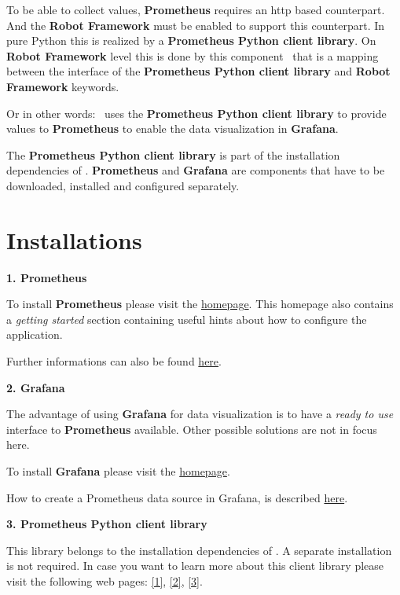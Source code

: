 To be able to collect values, \textbf{Prometheus} requires an http based counterpart. And the \textbf{Robot Framework} must be enabled to support this counterpart.
In pure Python this is realized by a \textbf{Prometheus Python client library}. On \textbf{Robot Framework} level this is done by this component \pkg\ that is a mapping
between the interface of the \textbf{Prometheus Python client library} and \textbf{Robot Framework} keywords.

Or in other words: \pkg\ uses the \textbf{Prometheus Python client library} to provide values to \textbf{Prometheus} to enable the data visualization in \textbf{Grafana}.

The \textbf{Prometheus Python client library} is part of the installation dependencies of \pkg. \textbf{Prometheus} and \textbf{Grafana} are components that
have to be downloaded, installed and configured separately.


\section{Installations}

\textbf{1. Prometheus}

To install \textbf{Prometheus} please visit the \href{https://prometheus.io/}{homepage}. This homepage also contains a \textit{getting started} section containing useful hints
about how to configure the application.

Further informations can also be found \href{https://www.fullstackpython.com/prometheus.html}{here}.

\textbf{2. Grafana}

The advantage of using \textbf{Grafana} for data visualization is to have a \textit{ready to use} interface to \textbf{Prometheus} available. Other possible solutions are not in focus here.

To install \textbf{Grafana} please visit the \href{https://grafana.com/}{homepage}.

How to create a Prometheus data source in Grafana, is described \href{https://prometheus.io/docs/visualization/grafana/}{here}.

\textbf{3. Prometheus Python client library}

This library belongs to the installation dependencies of \pkg. A separate installation is not required. In case you want to learn more about this client library please visit the following web pages:
\href{https://pypi.org/project/prometheus-client/}{[1]}, \href{https://prometheus.github.io/client_python/}{[2]}, \href{https://prometheus.io/docs/prometheus/latest/getting_started/}{[3]}.

